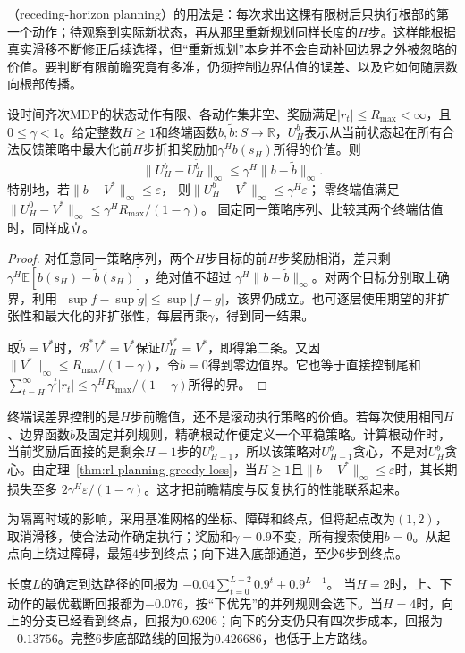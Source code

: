 （receding-horizon planning）的用法是：每次求出这棵有限树后只执行根部的第一个动作；待观察到实际新状态，再从那里重新规划同样长度的$H$步。这样能根据真实滑移不断修正后续选择，但“重新规划”本身并不会自动补回边界之外被忽略的价值。要判断有限前瞻究竟有多准，仍须控制边界估值的误差、以及它如何随层数向根部传播。

\begin{theorem}[有限前瞻的终端误差]
 \label{thm:rl-planning-terminal-error}
 设时间齐次MDP的状态动作有限、各动作集非空、奖励满足$|r_t|\leq R_{\max}<\infty$，且$0\leq\gamma<1$。给定整数$H\geq1$和终端函数$b,\tilde b:S\to\mathbb R$，$U_H^b$表示从当前状态起在所有合法反馈策略中最大化前$H$步折扣奖励加$\gamma^H b(s_H)$所得的价值。则
 \[
 \lVert U_H^b-U_H^{\tilde b}\rVert_\infty
 \leq\gamma^H\lVert b-\tilde b\rVert_\infty.
 \]
 特别地，若$\lVert b-V^*\rVert_\infty\leq\varepsilon$，
 则$\lVert U_H^b-V^*\rVert_\infty\leq\gamma^H\varepsilon$；
 零终端值满足
 $\lVert U_H^0-V^*\rVert_\infty\leq\gamma^H R_{\max}/(1-\gamma)$。
 固定同一策略序列、比较其两个终端估值时，同样成立。
\end{theorem}
\begin{proof}
 对任意同一策略序列，两个$H$步目标的前$H$步奖励相消，差只剩
 $\gamma^H\mathbb E[b(s_H)-\tilde b(s_H)]$，绝对值不超过
 $\gamma^H\lVert b-\tilde b\rVert_\infty$。对两个目标分别取上确界，利用
 $|\sup f-\sup g|\leq\sup|f-g|$，该界仍成立。也可逐层使用期望的非扩张性和最大化的非扩张性，每层再乘$\gamma$，得到同一结果。

 取$\tilde b=V^*$时，$\mathcal B^*V^*=V^*$保证$U_H^{V^*}=V^*$，即得第二条。又因$\lVert V^*\rVert_\infty\leq R_{\max}/(1-\gamma)$，令$b=0$得到零边值界。它也等于直接控制尾和
 $\sum_{t=H}^{\infty}\gamma^t|r_t|\leq\gamma^H R_{\max}/(1-\gamma)$所得的界。
\end{proof}

终端误差界控制的是$H$步前瞻值，还不是滚动执行策略的价值。若每次使用相同$H$、边界函数$b$及固定并列规则，精确根动作便定义一个平稳策略。计算根动作时，当前奖励后面接的是剩余$H-1$步的$U_{H-1}^b$，所以该策略对$U_{H-1}^b$贪心，不是对$U_H^b$贪心。由定理~\ref{thm:rl-planning-greedy-loss}，当$H\geq1$且$\lVert b-V^*\rVert_\infty\leq\varepsilon$时，其长期损失至多
$2\gamma^H\varepsilon/(1-\gamma)$。这才把前瞻精度与反复执行的性能联系起来。

\begin{example}[同一障碍下的短前瞻]
 \label{ex:rl-planning-detour}
 为隔离时域的影响，采用基准网格的坐标、障碍和终点，但将起点改为$(1,2)$，取消滑移，使合法动作确定执行；奖励和$\gamma=0.9$不变，所有搜索使用$b=0$。从起点向上绕过障碍，最短4步到终点；向下进入底部通道，至少6步到终点。

 长度$L$的确定到达路径的回报为
 $-0.04\sum_{t=0}^{L-2}0.9^t+0.9^{L-1}$。
 当$H=2$时，上、下动作的最优截断回报都为$-0.076$，按“下优先”的并列规则会选下。当$H=4$时，向上的分支已经看到终点，回报为$0.6206$；向下的分支仍只有四次步成本，回报为$-0.13756$。完整6步底部路线的回报为$0.426686$，也低于上方路线。
\end{example}

